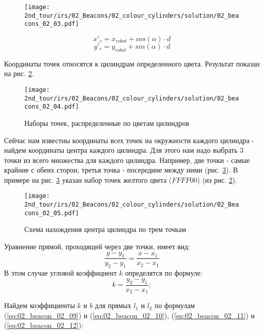 \begin{figure}[h!]
	\centering
	\texttt{[image: 2nd\_tour/irs/02\_Beacons/02\_colour\_cylinders/solution/02\_beacons\_02\_03.pdf]}
	\caption{}
	\label{fig:02_beacons_02_03}
\end{figure}

\begin{equation}
x'_c = x_{robot} + cos(\alpha) \cdot d
\label{eq:02_beacon_02_05}
\end{equation}
\begin{equation}
y'_c = y_{robot} + sin(\alpha) \cdot d
\label{eq:02_beacon_02_06}
\end{equation}

Координаты точек относятся к цилиндрам определенного цвета. Результат показан на рис. \ref{fig:02_beacons_02_04}.

\begin{figure}[h!]
	\centering
	\texttt{[image: 2nd\_tour/irs/02\_Beacons/02\_colour\_cylinders/solution/02\_beacons\_02\_04.pdf]}
	\caption{Наборы точек, распределенные по цветам цилиндров}
	\label{fig:02_beacons_02_04}
\end{figure}


Сейчас нам известны координаты всех точек на окружности каждого цилиндра - найдем координаты центра каждого цилиндра.
Для этого нам надо выбрать 3 точки из всего множества для каждого цилиндра. Например, две точки - самые крайние с обеих сторон, третья точка - посередине между ними (рис. \ref{fig:02_beacons_02_05}). В примере на рис. \ref{fig:02_beacons_02_05} указан набор точек желтого цвета ($FFFF00$) (из рис. \ref{fig:02_beacons_02_04}).

\begin{figure}[h]
	\centering
	\texttt{[image: 2nd\_tour/irs/02\_Beacons/02\_colour\_cylinders/solution/02\_Beacons\_02\_05.pdf]}
	\caption{Схема нахождения центра цилиндра по трем точкам}
	\label{fig:02_beacons_02_05}
\end{figure}

Уравнение прямой, проходящей через две точки, имеет вид:
\begin{equation*}
\frac{y-y_1}{y_2-y_1} = \frac{x-x_1}{x_2-x_1}
\end{equation*}
В этом случае угловой коэффициент $k$ определятся по формуле:
\begin{equation*}
k = \frac{y_2-y_1}{x_2-x_1};
\end{equation*}

Найдем коэффициенты $k$ и $b$ для прямых $l_1$ и $l_2$ по формулам (\ref{eq:02_beacon_02_09}) и (\ref{eq:02_beacon_02_10}), (\ref{eq:02_beacon_02_11}) и (\ref{eq:02_beacon_02_12}):

